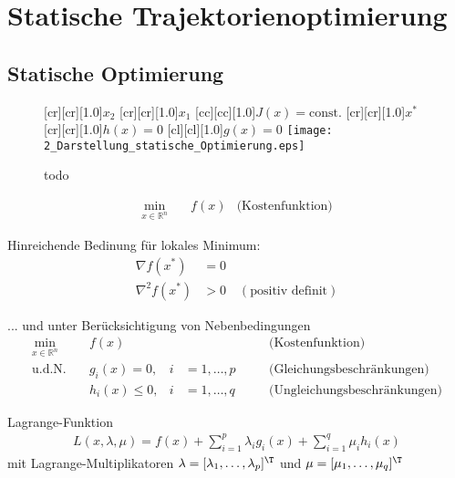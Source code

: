 \chapter{Statische Trajektorienoptimierung} \label{chap:statische_Optimierung}

\section{Statische Optimierung}
\begin{figure}[h]
[cr][cr][1.0]{$x_2$}
[cr][cr][1.0]{$x_1$}
[cc][cc][1.0]{$J(x)=\text{const.}$}
[cr][cr][1.0]{$x^\ast$}
[cr][cr][1.0]{$h(x)=0$}
[cl][cl][1.0]{$g(x) = 0$}
	\centering
  	\texttt{[image: 2\_Darstellung\_statische\_Optimierung.eps]}
		\vspace{-0.1cm}
  	\caption{todo}
    \label{fig:grundidee_nmpc}
		\vspace{-0.2cm}
\end{figure} 
\begin{align}
	\min_{x\in \mathbb R^n} \quad & f(x) &\text{(Kostenfunktion)}
\end{align}

Hinreichende Bedinung für lokales Minimum: %
\begin{align}
	\nabla f(x^\ast) &= 0 \\
	\nabla^2 f(x^\ast) &> 0 \quad (\text{positiv definit})
\end{align}

... und unter Berücksichtigung von Nebenbedingungen
\begin{align}
	\min_{x\in \mathbb R^n} \quad & f(x) & & & &\text{(Kostenfunktion)}\\
	\text{u.d.N.} 	 \quad &g_i(x) = 0, & i &= 1, \ldots, p \quad & &\text{(Gleichungsbeschränkungen)} \\
						& h_i(x) \leq 0,  & i &= 1, \ldots, q & &\text{(Ungleichungsbeschränkungen)}
\end{align}

Lagrange-Funktion
\begin{align}
	L(x,\lambda,\mu) = f(x) + \sum_{i=1}^p \lambda_i g_i(x) + \sum_{i=1}^q\mu_i h_i(x)
\end{align}
mit Lagrange-Multiplikatoren $\lambda = [\lambda_1, \ldots, \lambda_p]^\T$ und $\mu = [\mu_1, \ldots, \mu_q]^\T$

